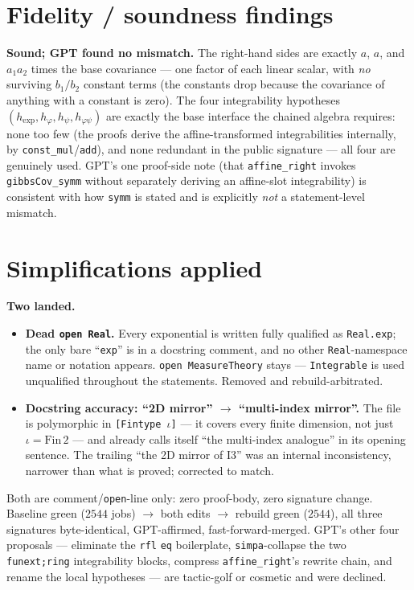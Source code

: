 \documentclass[11pt]{article}
\begin{document}
\section{Fidelity / soundness findings}
\textbf{Sound; GPT found no mismatch.} The right-hand sides are exactly $a$, $a$, and $a_1a_2$ times the base
covariance --- one factor of each linear scalar, with \emph{no} surviving $b_1/b_2$ constant terms (the
constants drop because the covariance of anything with a constant is zero). The four integrability hypotheses
$(h_{\exp},h_\varphi,h_\psi,h_{\varphi\psi})$ are exactly the base interface the chained algebra requires:
none too few (the proofs derive the affine-transformed integrabilities internally, by
\texttt{const\_mul}/\texttt{add}), and none redundant in the public signature --- all four are genuinely used.
GPT's one proof-side note (that \texttt{affine\_right} invokes \texttt{gibbsCov\_symm} without separately
deriving an affine-slot integrability) is consistent with how \texttt{symm} is stated and is explicitly
\emph{not} a statement-level mismatch.

\section{Simplifications applied}
\textbf{Two landed.}
\begin{itemize}[noitemsep]
  \item \textbf{Dead \texttt{open Real}.} Every exponential is written fully qualified as \texttt{Real.exp};
    the only bare ``\texttt{exp}'' is in a docstring comment, and no other \texttt{Real}-namespace name or
    notation appears. \texttt{open MeasureTheory} stays --- \texttt{Integrable} is used unqualified throughout
    the statements. Removed and rebuild-arbitrated.
  \item \textbf{Docstring accuracy: ``2D mirror'' $\to$ ``multi-index mirror''.} The file is polymorphic in
    \texttt{[Fintype $\iota$]} --- it covers every finite dimension, not just $\iota=\mathrm{Fin}\,2$ --- and
    already calls itself ``the multi-index analogue'' in its opening sentence. The trailing ``the 2D mirror of
    I3'' was an internal inconsistency, narrower than what is proved; corrected to match.
\end{itemize}
Both are comment/\texttt{open}-line only: zero proof-body, zero signature change. Baseline green
($2544$ jobs) $\to$ both edits $\to$ rebuild green ($2544$), all three signatures byte-identical,
GPT-affirmed, fast-forward-merged. GPT's other four proposals --- eliminate the \texttt{rfl} \texttt{eq}
boilerplate, \texttt{simpa}-collapse the two \texttt{funext;ring} integrability blocks, compress
\texttt{affine\_right}'s rewrite chain, and rename the local hypotheses --- are tactic-golf or cosmetic and
were declined.
\end{document}
